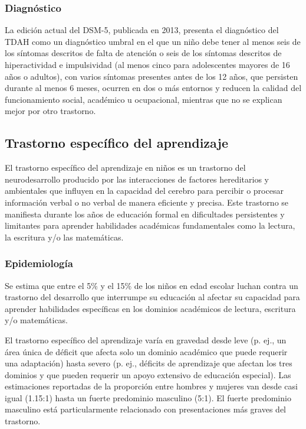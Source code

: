 \documentclass[11pt,letterpaper]{report}
\begin{document}
\subsubsection{Diagnóstico}
La edición actual del DSM-5, publicada en 2013, presenta el diagnóstico del
TDAH como un diagnóstico umbral en el que un niño debe tener al menos seis de
los síntomas descritos de falta de atención o seis de los síntomas descritos
de hiperactividad e impulsividad (al menos cinco para adolescentes mayores de
16 años o adultos), con varios síntomas presentes antes de los 12 años, que
persisten durante al menos 6 meses, ocurren en dos o más entornos y reducen la
calidad del funcionamiento social, académico u ocupacional, mientras que no se
explican mejor por otro trastorno. \cite{Lazar2025}

\subsection{Trastorno específico del aprendizaje}
El trastorno específico del aprendizaje en niños es un trastorno del
neurodesarrollo producido por las interacciones de factores hereditarios y
ambientales que influyen en la capacidad del cerebro para percibir o procesar
información verbal o no verbal de manera eficiente y precisa. Este trastorno
se manifiesta durante los años de educación formal en dificultades
persistentes y limitantes para aprender habilidades académicas fundamentales
como la lectura, la escritura y/o las matemáticas. \cite{Frierson2025}

\subsubsection{Epidemiología}
Se estima que entre el 5\% y el 15\% de los niños en edad escolar luchan
contra un trastorno del desarrollo que interrumpe su educación al afectar su
capacidad para aprender habilidades específicas en los dominios académicos de
lectura, escritura y/o matemáticas. \cite{Frierson2025}

El trastorno específico del aprendizaje varía en gravedad desde leve (p. ej.,
un área única de déficit que afecta solo un dominio académico que puede
requerir una adaptación) hasta severo (p. ej., déficits de aprendizaje que
afectan los tres dominios y que pueden requerir un apoyo extensivo de
educación especial). Las estimaciones reportadas de la proporción entre
hombres y mujeres van desde casi igual (1.15:1) hasta un fuerte predominio
masculino (5:1). El fuerte predominio masculino está particularmente
relacionado con presentaciones más graves del trastorno. \cite{Frierson2025}
\end{document}

